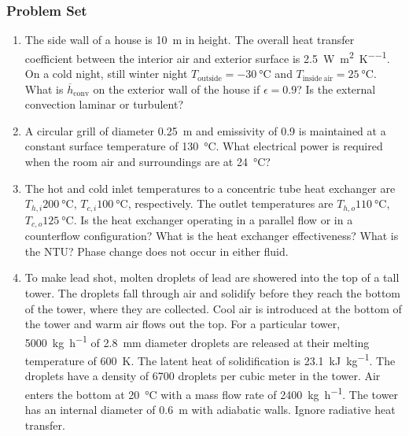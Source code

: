 \documentclass[12pt,letterpaper]{article}
\begin{document}
\subsubsection*{Problem Set}
\begin{enumerate}
    \item The side wall of a house is \SI{10}{\meter} in height.
        The overall heat transfer coefficient between the interior air and exterior surface is \SI{2.5}{\watt\per\square\meter\per\kelvin}.
        On a cold night, still winter night $T_{\mathrm{outside}} = - \SI{30}{\celsius}$ and $T_{\mathrm{inside~air}} = \SI{25}{\celsius}$.
        What is $\overline{h}_{\mathrm{conv}}$ on the exterior wall of the house if $\epsilon = 0.9$?
        Is the external convection laminar or turbulent?
    
    \item A circular grill of diameter \SI{0.25}{\meter} and emissivity of 0.9 is maintained at a constant surface temperature of \SI{130}{\celsius}.
        What electrical power is required when the room air and surroundings are at \SI{24}{\celsius}?
    
    \item The hot and cold inlet temperatures to a concentric tube heat exchanger are $T_{h,i} \SI{200}{\celsius}$, $T_{c,i} \SI{100}{\celsius}$, respectively.
        The outlet temperatures are $T_{h,o} \SI{110}{\celsius}$, $T_{c,o} \SI{125}{\celsius}$.
        Is the heat exchanger operating in a parallel flow or in a counterflow configuration?
        What is the heat exchanger effectiveness?
        What is the NTU?
        Phase change does not occur in either fluid.

    \item To make lead shot, molten droplets of lead are showered into the top of a tall tower.
        The droplets fall through air and solidify before they reach the bottom of the tower, where they are collected.
        Cool air is introduced at the bottom of the tower and warm air flows out the top.
        For a particular tower, \SI{5000}{\kilogram\per\hour} of \SI{2.8}{\milli\meter} diameter droplets are released at their melting temperature of \SI{600}{\kelvin}.
        The latent heat of solidification is \SI{23.1}{\kilo\joule\per\kilogram}.
        The droplets have a density of \num{6700} droplets per cubic meter in the tower.
        Air enters the bottom at \SI{20}{\celsius} with a mass flow rate of \SI{2400}{\kilogram\per\hour}.
        The tower has an internal diameter of \SI{0.6}{\meter} with adiabatic walls.
        Ignore radiative heat transfer.


\end{enumerate}
\end{document}
